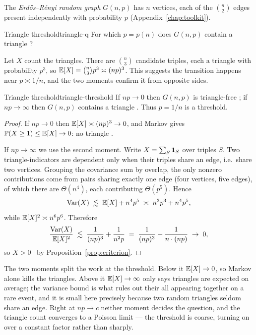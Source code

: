 The \emph{Erd\H{o}s--R\'enyi random graph} $G(n,p)$ has $n$ vertices, each of the
$\binom n2$ edges present independently with probability $p$ (Appendix~\ref{chap:toolkit}).

\begin{question}{Triangle threshold}{triangle-q}
For which $p=p(n)$ does $G(n,p)$ contain a triangle \whp?
\end{question}

Let $X$ count the triangles. There are $\binom n3$ candidate triples, each a
triangle with probability $p^3$, so $\mathbb{E}[X]=\binom n3 p^3\asymp (np)^3$. This
suggests the transition happens near $p\asymp 1/n$, and the two moments confirm
it from opposite sides.

\begin{theorem}{Triangle threshold}{triangle-threshold}
If $np\to0$ then $G(n,p)$ is triangle-free \whp; if $np\to\infty$ then $G(n,p)$
contains a triangle \whp. Thus $p=1/n$ is a threshold.
\end{theorem}

\begin{proof}
If $np\to0$ then $\mathbb{E}[X]\asymp(np)^3\to0$, and Markov gives
$\mathbb{P}(X\ge1)\le\mathbb{E}[X]\to0$: no triangle \whp.

If $np\to\infty$ we use the second moment. Write $X=\sum_S\mathbf{1}_S$ over triples
$S$. Two triangle-indicators are dependent only when their triples share an
edge, i.e.\ share two vertices. Grouping the covariance sum by overlap, the
only nonzero contributions come from pairs sharing exactly one edge (four
vertices, five edges), of which there are $\Theta(n^4)$, each contributing
$\Theta(p^5)$. Hence
\[
  \operatorname{Var}(X)\;\lesssim\;\mathbb{E}[X] + n^4 p^5\;\asymp\;n^3p^3+n^4p^5,
\]
while $\mathbb{E}[X]^2\asymp n^6p^6$. Therefore
\[
  \frac{\operatorname{Var}(X)}{\mathbb{E}[X]^2}\;\lesssim\;\frac{1}{(np)^3}+\frac{1}{n^2p}
  \;=\;\frac1{(np)^3}+\frac1{n\cdot(np)}\;\to\;0,
\]
so $X>0$ \whp\ by Proposition~\ref{prop:criterion}.
\end{proof}

\begin{insight}
The two moments split the work at the threshold. Below it $\mathbb{E}[X]\to0$, so Markov
alone kills the triangles. Above it $\mathbb{E}[X]\to\infty$ only says triangles are
expected on average; the variance bound is what rules out their all appearing
together on a rare event, and it is small here precisely because two random
triangles seldom share an edge. Right at $np\to c$ neither moment decides the
question, and the triangle count converges to a Poisson limit --- the threshold
is coarse, turning on over a constant factor rather than sharply.
\end{insight}

